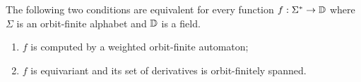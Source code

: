 \begin{theorem}\label{thm:orbit-finite-fliess}
    The following two conditions are equivalent for every function
    $f : \Sigma^* \to \mathbb D$
    where $\Sigma$ is an orbit-finite alphabet and $\mathbb D$ is a field.
    \begin{enumerate}
        \item \label{it:fliess-weighted} $f$ is computed by a weighted orbit-finite automaton;
        \item \label{it:fliess-derivatives} $f$ is equivariant and its set of derivatives is orbit-finitely spanned.
    \end{enumerate}
\end{theorem}
